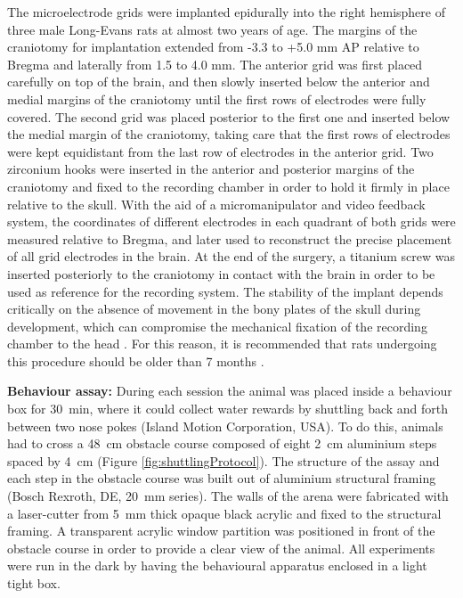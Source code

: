 The microelectrode grids were implanted epidurally into the right hemisphere of three male Long-Evans rats at almost two years of age. The margins of the craniotomy for implantation extended from -3.3 to +5.0 \si{\milli\meter} AP relative to Bregma and laterally from 1.5 to 4.0 \si{\milli\meter}. The anterior grid was first placed carefully on top of the brain, and then slowly inserted below the anterior and medial margins of the craniotomy until the first rows of electrodes were fully covered. The second grid was placed posterior to the first one and inserted below the medial margin of the craniotomy, taking care that the first rows of electrodes were kept equidistant from the last row of electrodes in the anterior grid. Two zirconium hooks were inserted in the anterior and posterior margins of the craniotomy and fixed to the recording chamber in order to hold it firmly in place relative to the skull. With the aid of a micromanipulator and video feedback system, the coordinates of different electrodes in each quadrant of both grids were measured relative to Bregma, and later used to reconstruct the precise placement of all grid electrodes in the brain. At the end of the surgery, a titanium screw was inserted posteriorly to the craniotomy in contact with the brain in order to be used as reference for the recording system. The stability of the implant depends critically on the absence of movement in the bony plates of the skull during development, which can compromise the mechanical fixation of the recording chamber to the head \cite{Dimitriadis2014}. For this reason, it is recommended that rats undergoing this procedure should be older than 7 months \cite{Dimitriadis2014}.

\textbf{Behaviour assay:} During each session the animal was placed inside a behaviour box for \SI{30}{\minute}, where it could collect water rewards by shuttling back and forth between two nose pokes (Island Motion Corporation, USA). To do this, animals had to cross a \SI{48}{\centi\meter} obstacle course composed of eight \SI{2}{\centi\meter} aluminium steps spaced by \SI{4}{\centi\meter} (Figure \ref{fig:shuttlingProtocol}). The structure of the assay and each step in the obstacle course was built out of aluminium structural framing (Bosch Rexroth, DE, \SI{20}{\milli\meter} series). The walls of the arena were fabricated with a laser-cutter from \SI{5}{\milli\meter} thick opaque black acrylic and fixed to the structural framing. A transparent acrylic window partition was positioned in front of the obstacle course in order to provide a clear view of the animal. All experiments were run in the dark by having the behavioural apparatus enclosed in a light tight box.

